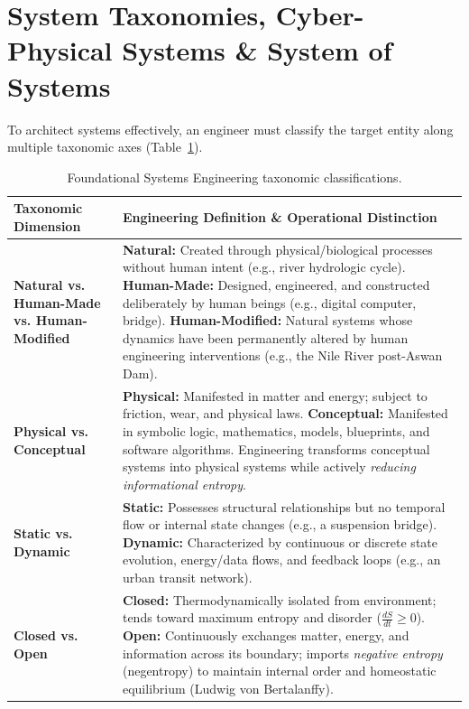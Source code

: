 \section{System Taxonomies, Cyber-Physical Systems \& System of Systems}
\label{sec:system_taxonomies}

To architect systems effectively, an engineer must classify the target entity along multiple taxonomic axes (Table~\ref{tab:system_classifications}).

\begin{table}[htbp]
\centering
\small
\renewcommand{\arraystretch}{1.2}
\begin{tabularx}{\textwidth}{p{3.5cm}X}
\toprule
\textbf{Taxonomic Dimension} & \textbf{Engineering Definition \& Operational Distinction} \\
\midrule
\textbf{Natural vs. Human-Made vs. Human-Modified} & 
\textbf{Natural:} Created through physical/biological processes without human intent (e.g., river hydrologic cycle).\newline
\textbf{Human-Made:} Designed, engineered, and constructed deliberately by human beings (e.g., digital computer, bridge).\newline
\textbf{Human-Modified:} Natural systems whose dynamics have been permanently altered by human engineering interventions (e.g., the Nile River post-Aswan Dam). \\
\addlinespace
\textbf{Physical vs. Conceptual} &
\textbf{Physical:} Manifested in matter and energy; subject to friction, wear, and physical laws.\newline
\textbf{Conceptual:} Manifested in symbolic logic, mathematics, models, blueprints, and software algorithms. Engineering transforms conceptual systems into physical systems while actively \textit{reducing informational entropy}. \\
\addlinespace
\textbf{Static vs. Dynamic} &
\textbf{Static:} Possesses structural relationships but no temporal flow or internal state changes (e.g., a suspension bridge).\newline
\textbf{Dynamic:} Characterized by continuous or discrete state evolution, energy/data flows, and feedback loops (e.g., an urban transit network). \\
\addlinespace
\textbf{Closed vs. Open} &
\textbf{Closed:} Thermodynamically isolated from environment; tends toward maximum entropy and disorder ($\frac{dS}{dt} \ge 0$).\newline
\textbf{Open:} Continuously exchanges matter, energy, and information across its boundary; imports \textit{negative entropy} (negentropy) to maintain internal order and homeostatic equilibrium (Ludwig von Bertalanffy). \\
\bottomrule
\end{tabularx}
\caption{Foundational Systems Engineering taxonomic classifications.}
\label{tab:system_classifications}
\end{table}

